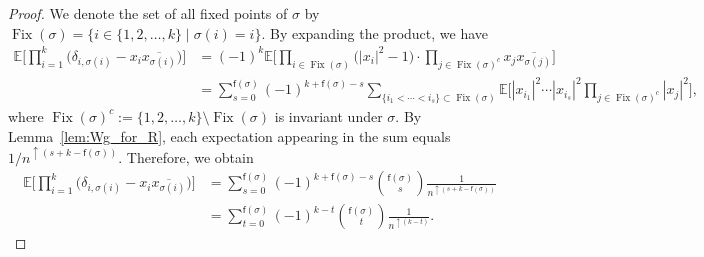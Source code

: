 \documentclass[10pt,a4paper]{amsart}
\numberwithin{equation}{section}
\theoremstyle{definition}
\newcommand{\fix}[1]{\mathsf{f}(#1)}
\DeclareMathOperator{\Fix}{Fix}
\begin{document}
\begin{proof}
We denote the set of all fixed points of $\sigma$ by
$\Fix (\sigma)= \{i \in\{1,2,\dots,k\} \mid \sigma(i)=i\}$.
By expanding the product, we have
\begin{align*}
 \mathbb{E} \Biggl[
\prod_{i=1}^k \bigl( \delta_{i,\sigma(i)} - x_i \overline{x_{\sigma(i)}} \bigl) \Biggr] &
 = (-1)^k \mathbb{E} \Biggl[ \prod_{i \in \Fix(\sigma)} \bigl(|x_i|^2-1\bigr) \cdot
 \prod_{j \in \Fix(\sigma)^c} x_j \overline{x_{\sigma(j)}} \Biggr] \\
 &= \sum_{s=0}^{\fix{\sigma}} (-1)^{k+\fix{\sigma}-s} \!\!\sum_{ \{i_1< \cdots <i_{s} \} \subset \Fix(\sigma)}\!\!
 \mathbb{E} \Biggl[ |x_{i_1}|^2 \cdots |x_{i_{s}}|^2 \prod_{j \in \Fix(\sigma)^c}|x_j|^2\Biggr],
\end{align*}
where $\Fix(\sigma)^c :=\{1,2,\dots,k \} \setminus \Fix(\sigma)$ is invariant under $\sigma$.
By Lemma~\ref{lem:Wg_for_R}, each expectation appearing in the sum equals $1/n^{\uparrow (s+k-\fix{\sigma})}$.
Therefore, we obtain
\begin{align*}
 \mathbb{E} \Biggl[
\prod_{i=1}^k \bigl( \delta_{i,\sigma(i)} - x_i \overline{x_{\sigma(i)}} \bigl) \Biggr]
&= \sum_{s=0}^{\fix{\sigma}} (-1)^{k+\fix{\sigma}-s} \binom{\fix{\sigma}}{s} \frac{1}{n^{\uparrow (s+k-\fix{\sigma})}} \\
&= \sum_{t=0}^{\fix{\sigma}} (-1)^{k-t} \binom{\fix{\sigma}}{t} \frac{1}{n^{\uparrow (k-t)}}.\tag*{\qed}
\end{align*}\renewcommand{\qed}{}
\end{proof}
\end{document}

